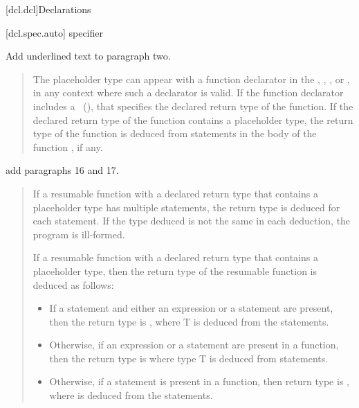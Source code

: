 
\setcounter{chapter}{6}
[dcl.dcl]{Declarations}

\setcounter{section}{1}
\setcounter{subsection}{5}
\setcounter{subsubsection}{3}
[dcl.spec.auto]{ specifier}

Add underlined text to paragraph two.

\begin{quote}
\setcounter{Paras}{1}
\pnum
The placeholder type can appear with a function declarator in the
, ,
, or ,
in any context where such a declarator is valid. If the function declarator
includes a ~(), that specifies
the declared return type of the function. If the declared return type of the
function contains a placeholder type, the return type of the function is
deduced from  statements in the body of the function , if any.
\end{quote}

add paragraphs 16 and 17.

\begin{quote}
\setcounter{Paras}{15}
\pnum
If a resumable function with a declared return type that contains a placeholder type has multiple  statements, the return type is deduced for each
 statement. If the type deduced is not the same in each
deduction, the program is ill-formed.

\pnum
If a resumable function with a declared return type that contains a placeholder type, then the return type of the resumable function is deduced as follows:

\begin{itemize}
\item If a  statement and either an  expression or a  statement are present, then
the return type is , where T is deduced from the  statements.

\item Otherwise, if an  expression or a  statement are present in a function, then
the return type is  where type T is deduced from 
 statements.

\item Otherwise, if a  statement is present in a function, then return type is
,
where  is deduced from the  statements.

\end{itemize}
\end{quote}
